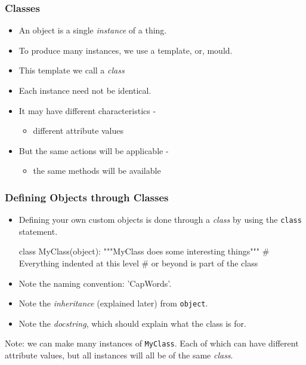 \documentclass{beamer}
\begin{document}
\begin{frame}[fragile]
\frametitle{Classes}
\begin{itemize}
\item An object is a single \emph{instance} of a thing.
\item To produce many instances, we use a template, or, mould.
\item This template we call a \emph{class}
\item Each instance need not be identical.
\item It may have different characteristics - 
\begin{itemize}
\item different attribute values
\end{itemize}
\item But the same actions will be applicable -
\begin{itemize}
\item the same methods will be available
\end{itemize}
\end{itemize}
\end{frame}

\begin{frame}[fragile]
\frametitle{Defining Objects through Classes}
\begin{itemize}
\item Defining your own custom objects is done through a \emph{class}
by using the \lstinline|class| statement.
\begin{code}
class MyClass(object):
  """MyClass does some interesting things"""
  # Everything indented at this level 
  # or beyond is part of the class
\end{code}
\item Note the naming convention: 'CapWords'.
\item Note the \emph{inheritance} (explained later) from \lstinline|object|.
\item Note the \emph{docstring}, which should explain what the class is for.
\end{itemize}
Note: we can make many instances of \lstinline|MyClass|. 
Each of which can have different attribute values,
but all instances will all be of the same \emph{class}.

\end{frame}
\end{document}
